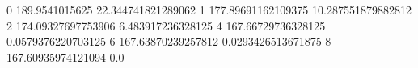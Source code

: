 0 189.9541015625 22.344741821289062
1 177.89691162109375 10.287551879882812
2 174.09327697753906 6.483917236328125
4 167.66729736328125 0.0579376220703125
6 167.63870239257812 0.0293426513671875
8 167.60935974121094 0.0
